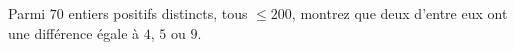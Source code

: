Parmi $70$ entiers positifs distincts, tous $\leq 200$, montrez que deux d'entre
eux ont une différence égale à $4$, $5$ ou $9$.
